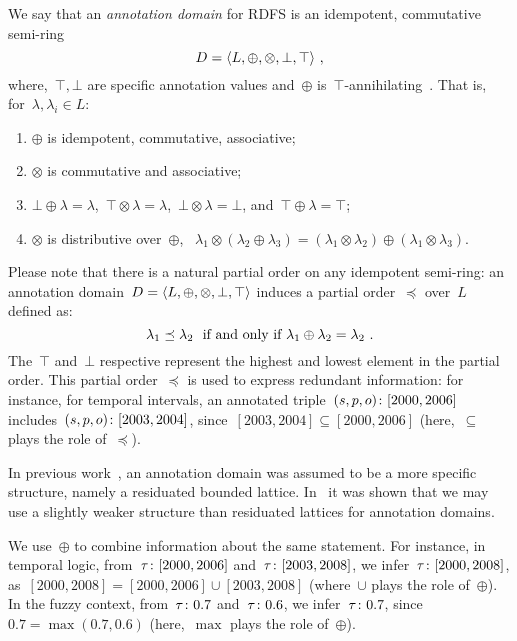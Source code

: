\begin{definition}
  We say that an \emph{annotation domain} for \ac{RDFS} is an idempotent, commutative semi-ring
  \[
  D = \langle L,  \oplus, \otimes, \bot, \top \rangle \ ,
  \]
  \nd where,~$\top,\bot$ are specific annotation values and~$\oplus$
  is~$\top$-annihilating~\citep{BunemanKostylev:2010aa}. That is, for~$\lambda, \lambda_{i} \in L$:

  \begin{enumerate}[noitemsep]
  \item $\oplus$ is idempotent, commutative, associative;
  \item $\otimes$ is commutative and associative;
  \item $\bot \oplus \lambda = \lambda$,~$\top \otimes \lambda = \lambda$,~$\bot \otimes \lambda = \bot$, and~$\top \oplus \lambda = \top$;
  \item $\otimes$ is distributive over~$\oplus$, \ie~$\lambda_{1} \otimes (\lambda_{2} \oplus \lambda_{3}) =
    (\lambda_{1} \otimes \lambda_{2}) \oplus (\lambda_{1} \otimes \lambda_{3})$.
  \end{enumerate}
\end{definition}
%
\nd Please note that there is a natural partial order on any idempotent semi-ring: an annotation domain~$D = \langle L,
  \oplus, \otimes, \bot, \top \rangle$ induces a partial order~$\preceq$ over~$L$ defined as:
%
\[
\lambda_{1} \preceq \lambda_{2} \mbox{ \ \iff  \ }  \lambda_{1} \oplus \lambda_{2} = \lambda_{2} \ .
\]
%
The~$\top$ and~$\bot$ respective represent the highest and lowest element in the partial order.  This partial
order~$\preceq$ is used to express redundant information: for instance, for temporal intervals, an annotated
triple~$\mbox{$(s,p,o)\colon[2000,2006]$}$ includes~$\mbox{$(s,p,o)\colon[2003,2004]$}$, since~$[2003,2004]
\subseteq [2000,2006]$ (here,~$\subseteq$ plays the role of~$\preceq$).


In previous work~\cite{StracciaLopesLukacsy:2010aa,LopesPolleresStraccia:2010aa}, an annotation domain was assumed to be
a more specific structure, namely a residuated bounded lattice.  In~\citet{BunemanKostylev:2010aa} it was shown that we
may use a slightly weaker structure than residuated lattices for annotation domains.




We use~$\oplus$ to combine information about the same statement.  For instance, in temporal logic,
from~$\mbox{$\tau\colon[2000,2006]$}$ and~$\mbox{$\tau\colon[2003,2008]$}$, we infer~$\mbox{$\tau\colon[2000,2008]$}$,
as~$[2000,2008] = [2000,2006]\cup [2003,2008]$ (where~$\cup$ plays the role of~$\oplus$).
%
In the fuzzy context, from~$\mbox{$\tau\colon0.7$}$ and~$\mbox{$\tau\colon0.6$}$, we infer~$\mbox{$\tau\colon0.7$}$, since~$0.7 =
\max(0.7, 0.6)$ (here,~$\max$ plays the role of~$\oplus$).

